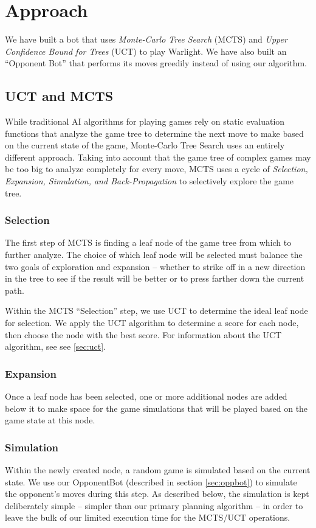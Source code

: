 \documentclass[a4paper,11pt]{article}
\begin{document}
\section{Approach}\label{sec:approach}
We have built a bot that uses \emph{Monte-Carlo Tree Search} (MCTS) and \emph{Upper 
Confidence Bound for Trees} (UCT) to play Warlight.  We have also built an ``Opponent Bot'' 
that performs its moves greedily instead of using our algorithm.

\subsection{UCT and MCTS}
While traditional AI algorithms for playing games rely on static evaluation functions that 
analyze the game tree to determine the next move to make based on the current state of the 
game, Monte-Carlo Tree Search uses an entirely different approach.  Taking into account that 
the game tree of complex games may be too big to analyze completely for every move, MCTS 
uses a cycle of \emph{Selection, Expansion, Simulation, and Back-Propagation} to selectively 
explore the game tree.

\subsubsection{Selection}
The first step of MCTS is finding a leaf node of the game tree from which to further 
analyze.  The choice of which leaf node will be selected must balance the two goals of 
exploration and expansion -- whether to strike off in a new direction in the tree to see if 
the result will be better or to press farther down the current path.

Within the MCTS ``Selection'' step, we use UCT to determine the ideal leaf node for 
selection.  We apply the UCT algorithm to determine a score for each node, then choose the 
node with the best score.  For information about the UCT algorithm, see see \ref{sec:uct}.

\subsubsection{Expansion}
Once a leaf node has been selected, one or more additional nodes are added below it to make 
space for the game simulations that will be played based on the game state at this node.

\subsubsection{Simulation}
Within the newly created node, a random game is simulated based on the current state.  We 
use our OpponentBot (described in section \ref{sec:oppbot}) to simulate the opponent's moves 
during this step.  As described below, the simulation is kept deliberately simple -- simpler 
than our primary planning algorithm -- in order to leave the bulk of our limited execution 
time for the MCTS/UCT operations.
\end{document}
